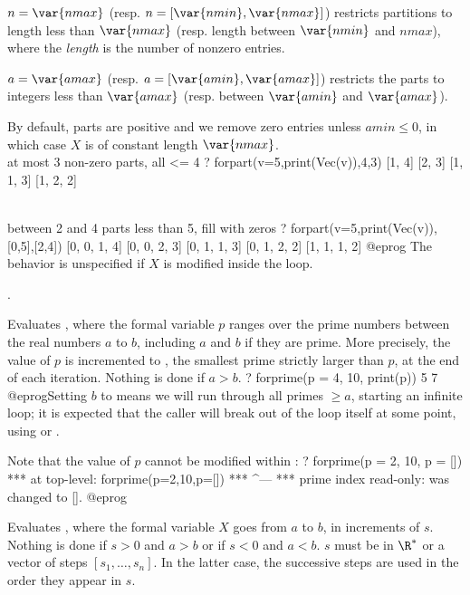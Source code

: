 \item $n=\var{nmax}$ (resp. $n=[\var{nmin},\var{nmax}]$) restricts
partitions to length less than $\var{nmax}$ (resp. length between
$\var{nmin}$ and $nmax$), where the \emph{length} is the number of nonzero
entries.

\item $a=\var{amax}$ (resp. $a=[\var{amin},\var{amax}]$) restricts the parts
to integers less than $\var{amax}$ (resp. between $\var{amin}$ and
$\var{amax}$).

By default, parts are positive and we remove zero entries unless $amin\leq0$,
in which case $X$ is of constant length $\var{nmax}$.
\bprog
\\ at most 3 non-zero parts, all <= 4
? forpart(v=5,print(Vec(v)),4,3)
[1, 4]
[2, 3]
[1, 1, 3]
[1, 2, 2]

\\ between 2 and 4 parts less than 5, fill with zeros
? forpart(v=5,print(Vec(v)),[0,5],[2,4])
[0, 0, 1, 4]
[0, 0, 2, 3]
[0, 1, 1, 3]
[0, 1, 2, 2]
[1, 1, 1, 2]
@eprog\noindent
The behavior is unspecified if $X$ is modified inside the loop.

.

\label{se:forprime}
Evaluates ,
where the formal variable $p$ ranges over the prime numbers between the real
numbers $a$ to $b$, including $a$ and $b$ if they are prime. More precisely,
the value of
$p$ is incremented to , the smallest prime strictly
larger than $p$, at the end of each iteration. Nothing is done if $a>b$.
\bprog
? forprime(p = 4, 10, print(p))
5
7
@eprog\noindent Setting $b$ to  means we will run through all primes
$\geq a$, starting an infinite loop; it is expected that the caller will break
out of the loop itself at some point, using  or .

Note that the value of $p$ cannot be modified within :
\bprog
? forprime(p = 2, 10, p = [])
 ***   at top-level: forprime(p=2,10,p=[])
 ***                                   ^---
 ***   prime index read-only: was changed to [].
@eprog

\label{se:forstep}
Evaluates ,
where the formal variable $X$ goes from $a$ to $b$, in increments of $s$.
Nothing is done if $s>0$ and $a>b$ or if $s<0$ and $a<b$. $s$ must be in
$\R^*$ or a vector of steps $[s_1,\dots,s_n]$. In the latter case, the
successive steps are used in the order they appear in $s$.

